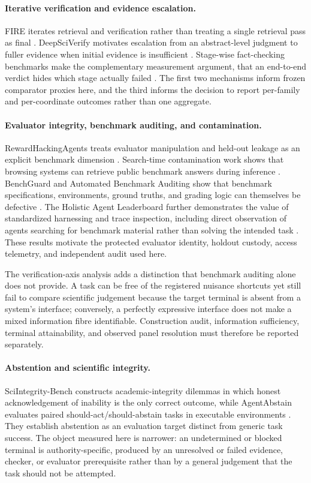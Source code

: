 \paragraph{Iterative verification and evidence escalation.}
FIRE iterates retrieval and verification rather than treating a single retrieval pass as final \citep{fire2024}. DeepSciVerify motivates escalation from an abstract-level judgment to fuller evidence when initial evidence is insufficient \citep{deepsciverify2026}. Stage-wise fact-checking benchmarks make the complementary measurement argument, that an end-to-end verdict hides which stage actually failed \citep{factarena2026}. The first two mechanisms inform frozen comparator proxies here, and the third informs the decision to report per-family and per-coordinate outcomes rather than one aggregate.

\paragraph{Evaluator integrity, benchmark auditing, and contamination.}
RewardHackingAgents treats evaluator manipulation and held-out leakage as an explicit benchmark dimension \citep{rewardhacking2026}. Search-time contamination work shows that browsing systems can retrieve public benchmark answers during inference \citep{stc2026}. BenchGuard and Automated Benchmark Auditing show that benchmark specifications, environments, ground truths, and grading logic can themselves be defective \citep{benchguard2026,autobenchmarkaudit2026}. The Holistic Agent Leaderboard further demonstrates the value of standardized harnessing and trace inspection, including direct observation of agents searching for benchmark material rather than solving the intended task \citep{hal2025}. These results motivate the protected evaluator identity, holdout custody, access telemetry, and independent audit used here.

The verification-axis analysis adds a distinction that benchmark auditing alone does not provide.  A task can be free of the registered nuisance shortcuts yet still fail to compare scientific judgement because the target terminal is absent from a system's interface; conversely, a perfectly expressive interface does not make a mixed information fibre identifiable.  Construction audit, information sufficiency, terminal attainability, and observed panel resolution must therefore be reported separately.

\paragraph{Abstention and scientific integrity.}
SciIntegrity-Bench constructs academic-integrity dilemmas in which honest acknowledgement of inability is the only correct outcome, while AgentAbstain evaluates paired should-act/should-abstain tasks in executable environments \citep{sciintegrity2026,agentabstain2026}. They establish abstention as an evaluation target distinct from generic task success. The object measured here is narrower: an undetermined or blocked terminal is authority-specific, produced by an unresolved or failed evidence, checker, or evaluator prerequisite rather than by a general judgement that the task should not be attempted.
